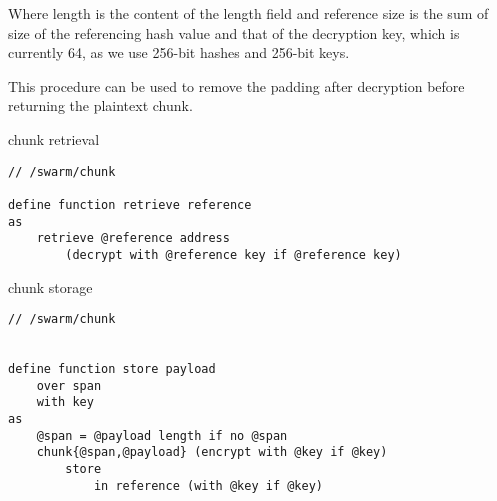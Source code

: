 Where length is the content of the length field and reference  size is the sum of size of the referencing hash value and that of the decryption key, which is currently 64, as we use 256-bit hashes and 256-bit keys.

This procedure can be used to remove the padding after decryption before returning the plaintext chunk. 

\begin{definition}{chunk retrieval}\label{def:retrieve}
\begin{lstlisting}[language=buzz1]
// /swarm/chunk

define function retrieve reference 
as 
    retrieve @reference address 
        (decrypt with @reference key if @reference key)

\end{lstlisting}
\end{definition}


\begin{definition}{chunk storage}\label{def:store}
\begin{lstlisting}[language=buzz1]
// /swarm/chunk


define function store payload
    over span 
    with key 
as 
    @span = @payload length if no @span  
    chunk{@span,@payload} (encrypt with @key if @key) 
        store 
            in reference (with @key if @key)
\end{lstlisting}
\end{definition}

